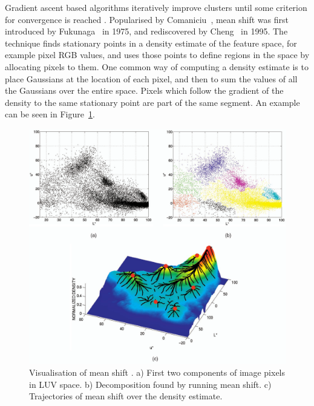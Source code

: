 \documentclass[11pt,a4paper]{kth-mag}
\begin{document}
Gradient ascent based algorithms iteratively improve clusters until some
criterion for convergence is reached \cite{achanta2012slic}. Popularised by
Comaniciu~\cite{comaniciu2002mean}, mean shift was first introduced by
Fukunaga~\cite{fukunaga1975estimation} in 1975, and rediscovered by
Cheng~\cite{cheng1995mean} in 1995. The technique finds stationary points in a
density estimate of the feature space, for example pixel RGB values, and uses
those points to define regions in the space by allocating pixels to them. One
common way of computing a density estimate is to place Gaussians at the location
of each pixel, and then to sum the values of all the Gaussians over the entire
space. Pixels which follow the gradient of the density to the same stationary
point are part of the same segment. An example can be seen in
Figure~\ref{fig:meanshift}.
\begin{figure}[t]
  \centering
  \includegraphics[width=\textwidth]{images/meanshift}
  \caption{Visualisation of mean shift \cite{comaniciu2002mean}. a) First two
    components of image pixels in LUV space. b) Decomposition found by running
    mean shift. c) Trajectories of mean shift over the density estimate.}
  \label{fig:meanshift}
\end{figure}
\end{document}

